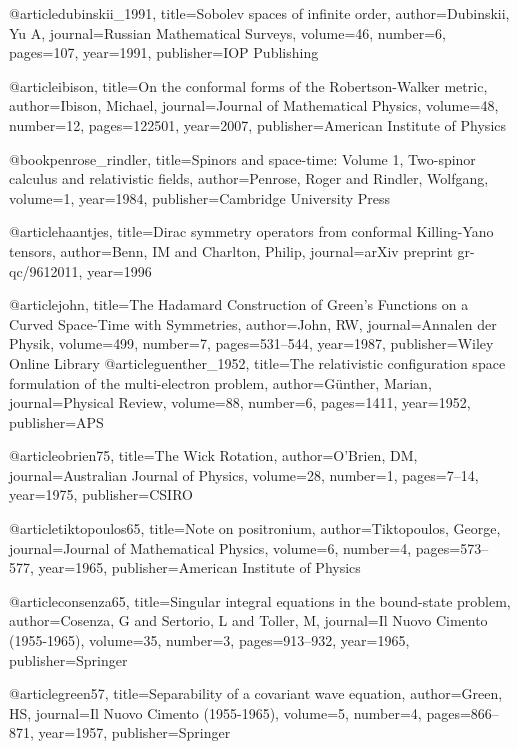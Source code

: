 @article{dubinskii_1991,
  title={Sobolev spaces of infinite order},
  author={Dubinskii, Yu A},
  journal={Russian Mathematical Surveys},
  volume={46},
  number={6},
  pages={107},
  year={1991},
  publisher={IOP Publishing}
}

@article{ibison,
  title={On the conformal forms of the Robertson-Walker metric},
  author={Ibison, Michael},
  journal={Journal of Mathematical Physics},
  volume={48},
  number={12},
  pages={122501},
  year={2007},
  publisher={American Institute of Physics}
}

@book{penrose_rindler,
  title={Spinors and space-time: Volume 1, Two-spinor calculus and relativistic fields},
  author={Penrose, Roger and Rindler, Wolfgang},
  volume={1},
  year={1984},
  publisher={Cambridge University Press}
}

@article{haantjes,
  title={Dirac symmetry operators from conformal Killing-Yano tensors},
  author={Benn, IM and Charlton, Philip},
  journal={arXiv preprint gr-qc/9612011},
  year={1996}
}

@article{john,
  title={The Hadamard Construction of Green's Functions on a Curved Space-Time with Symmetries},
  author={John, RW},
  journal={Annalen der Physik},
  volume={499},
  number={7},
  pages={531--544},
  year={1987},
  publisher={Wiley Online Library}
}
@article{guenther_1952,
  title={The relativistic configuration space formulation of the multi-electron problem},
  author={G{\"u}nther, Marian},
  journal={Physical Review},
  volume={88},
  number={6},
  pages={1411},
  year={1952},
  publisher={APS}
}


@article{obrien75,
  title={The Wick Rotation},
  author={O'Brien, DM},
  journal={Australian Journal of Physics},
  volume={28},
  number={1},
  pages={7--14},
  year={1975},
  publisher={CSIRO}
}

@article{tiktopoulos65,
  title={Note on positronium},
  author={Tiktopoulos, George},
  journal={Journal of Mathematical Physics},
  volume={6},
  number={4},
  pages={573--577},
  year={1965},
  publisher={American Institute of Physics}
}

@article{consenza65,
  title={Singular integral equations in the bound-state problem},
  author={Cosenza, G and Sertorio, L and Toller, M},
  journal={Il Nuovo Cimento (1955-1965)},
  volume={35},
  number={3},
  pages={913--932},
  year={1965},
  publisher={Springer}
}

@article{green57,
  title={Separability of a covariant wave equation},
  author={Green, HS},
  journal={Il Nuovo Cimento (1955-1965)},
  volume={5},
  number={4},
  pages={866--871},
  year={1957},
  publisher={Springer}
}

